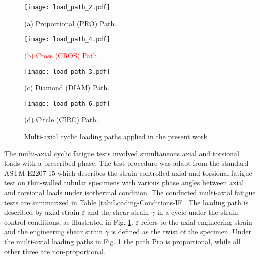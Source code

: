 \documentclass[preprint,5p,twocolumn,11pt,sort&compress]{elsarticle}
\newcommand{\marked}[1]{\textcolor{red}{#1}}
\begin{document}
\begin{figure}
  \begin{minipage}[t]{0.5\linewidth}
  \nonumber
    \centering
    \texttt{[image: load\_path\_2.pdf]}
    \centerline{\small (a) Proportional (PRO) Path.}
  \end{minipage}%
  \begin{minipage}[t]{0.5\linewidth}
    \centering
    \texttt{[image: load\_path\_4.pdf]}
    \centerline{\small \marked{ (b) Cross (CROS) Path.}}
  \end{minipage}
  \begin{minipage}[t]{0.5\linewidth}
  \nonumber
    \centering
    \texttt{[image: load\_path\_3.pdf]}
    \centerline{\small (c) Diamond (DIAM) Path.}
  \end{minipage}%
  \begin{minipage}[t]{0.5\linewidth}
    \centering
    \texttt{[image: load\_path\_6.pdf]}
    \centerline{\small (d) Circle (CIRC) Path.}
  \end{minipage}
  \caption{Multi-axial cyclic loading paths applied in the present work.}
  \label{Fig:LoadPath}
\end{figure}

The multi-axial cyclic fatigue tests involved simultaneous axial and torsional loads with a prescribed phase.
The test procedure was adapt from the standard ASTM E2207-15 which describes the strain-controlled axial and torsional fatigue test on thin-walled tubular specimens with various phase angles between axial and torsional loads under isothermal condition.
The conducted multi-axial fatigue tests are summarized in Table \ref{tab:Loading-Conditions-IF}. The loading path is described by axial strain $\varepsilon$ and the shear strain $\gamma$ in a cycle under the strain-control conditions, as illustrated in Fig. \ref{Fig:LoadPath}. $\varepsilon$ refers to the axial engineering strain and the engineering shear strain $\gamma$ is defined as the twist of the specimen. Under the multi-axial loading paths in Fig.  \ref{Fig:LoadPath} the path Pro is proportional, while all other three are non-proportional.
\end{document}
